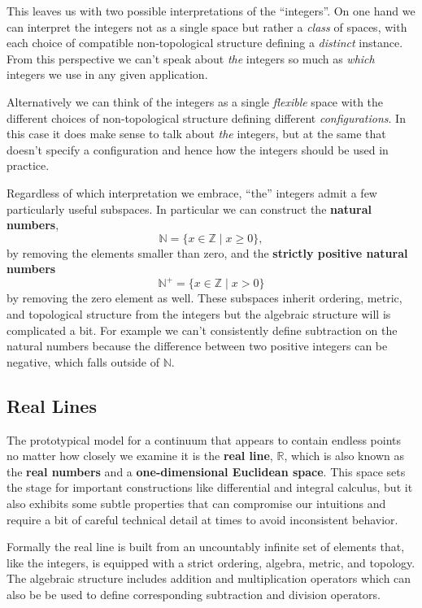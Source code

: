 \documentclass[
  letterpaper,
  DIV=11,
  numbers=noendperiod]{scrartcl}
\begin{document}
This leaves us with two possible interpretations of the ``integers''. On
one hand we can interpret the integers not as a single space but rather
a \emph{class} of spaces, with each choice of compatible non-topological
structure defining a \emph{distinct} instance. From this perspective we
can't speak about \emph{the} integers so much as \emph{which} integers
we use in any given application.

Alternatively we can think of the integers as a single \emph{flexible}
space with the different choices of non-topological structure defining
different \emph{configurations}. In this case it does make sense to talk
about \emph{the} integers, but at the same that doesn't specify a
configuration and hence how the integers should be used in practice.

Regardless of which interpretation we embrace, ``the'' integers admit a
few particularly useful subspaces. In particular we can construct the
\textbf{natural numbers}, \[
\mathbb{N} = \{ x \in \mathbb{Z} \mid x \ge 0 \},
\] by removing the elements smaller than zero, and the \textbf{strictly
positive natural numbers} \[
\mathbb{N}^{+} = \{ x \in \mathbb{Z} \mid x > 0 \}
\] by removing the zero element as well. These subspaces inherit
ordering, metric, and topological structure from the integers but the
algebraic structure will is complicated a bit. For example we can't
consistently define subtraction on the natural numbers because the
difference between two positive integers can be negative, which falls
outside of \(\mathbb{N}\).

\hypertarget{real-lines}{%
\subsection{Real Lines}\label{real-lines}}

The prototypical model for a continuum that appears to contain endless
points no matter how closely we examine it is the \textbf{real line},
\(\mathbb{R}\), which is also known as the \textbf{real numbers} and a
\textbf{one-dimensional Euclidean space}. This space sets the stage for
important constructions like differential and integral calculus, but it
also exhibits some subtle properties that can compromise our intuitions
and require a bit of careful technical detail at times to avoid
inconsistent behavior.

Formally the real line is built from an uncountably infinite set of
elements that, like the integers, is equipped with a strict ordering,
algebra, metric, and topology. The algebraic structure includes addition
and multiplication operators which can also be be used to define
corresponding subtraction and division operators.
\end{document}
